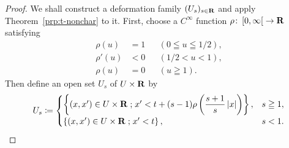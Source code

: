 \begin{proof}
  We shall construct a deformation family \((U_s)_{s\in\mathbf{R}}\) 
  and apply Theorem~\ref{prp:t-nonchar} to it. 
  First, choose a \(C^{\infty}\) function \(
    \rho\colon \left[0,\infty\right[\to \mathbf{R}
  \) satisfying
  \begin{align*}
    \rho(u)&=1&&(0\leqq u\leqq 1/2),\\
    \rho'(u)&<0&&(1/2< u< 1),\\
    \rho(u)&=0&&(u\geqq 1).
  \end{align*}
  Then define an open set \(U_{s}\) of \(U\times \mathbf{R}\) by
  \[
    U_{s}\coloneqq\begin{cases}
      \left\{
        (x,x')\in U\times \mathbf{R}\mathrel{;} 
        x'<t+ (s-1)\rho\left(
          \dfrac{s+1}{s}\left|x\right|
        \right)
      \right\},&s\geqq1,\\
      \left\{(x,x')\in U\times \mathbf{R}\mathrel{;} x'<t\right\},&s<1. 
    \end{cases}
  \]

\end{proof}
